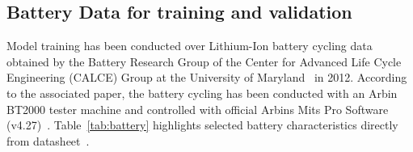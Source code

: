 \subsection{Battery Data for training and validation} \label{subsec:b_data}
%
Model training has been conducted over Lithium-Ion battery cycling data obtained by the Battery Research Group of the Center for Advanced Life Cycle Engineering (CALCE) Group at the University of Maryland~\cite{noauthor_calce_2017} in 2012.
According to the associated paper, the battery cycling has been conducted with an Arbin BT2000 tester machine and controlled with official Arbins Mits Pro Software (v4.27)~\cite{xing_state_2014}.
\mbox{Table~\ref{tab:battery}} highlights selected battery characteristics directly from datasheet~\cite{noauthor_anr26650m1a}.
\begin{table}[ht]
    \renewcommand{\arraystretch}{1.3}
    \caption{Battery characteristics}
    \centering
    \label{tab:battery}
\end{table}

